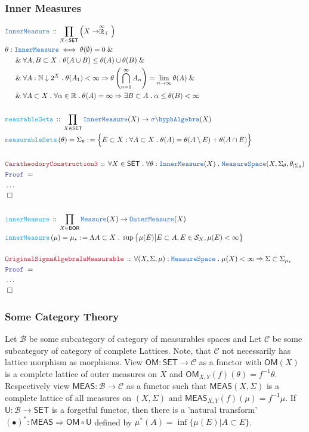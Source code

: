 \documentclass[12pt]{scrartcl}
\newcommand{\TYPE}[1]{\textcolor{NavyBlue}{\mathtt{#1}}}
\newcommand{\FUNC}[1]{\textcolor{Cerulean}{\mathtt{#1}}}
\newcommand{\LOGIC}[1]{\textcolor{Blue}{\mathtt{#1}}}
\newcommand{\THM}[1]{\textcolor{Maroon}{\mathtt{#1}}}
\renewcommand{\.}{\; . \;}
\newcommand{\de}{: \kern 0.1pc =}
\newcommand{\Act}[1]{\left( #1 \right)}
\newcommand{\Theorem}[2]{& \THM{#1} \, :: \, #2 \\ & \Proof = \\ }
\newcommand{\DeclareType}[2]{& \TYPE{#1} \, :: \, #2 \\}
\newcommand{\DefineType}[3]{& #1 : \TYPE{#2} \iff #3 \\}
\newcommand{\DeclareFunc}[2]{& \FUNC{#1} \, :: \, #2 \\}
\newcommand{\DefineNamedFunc}[4]{&  \FUNC{#1}\Act{#2} = #3 \de #4 \\}
\newcommand{\NewLine}{\\ & \kern 1pc}
\newcommand{\Page}[1]{ \begin{align*} #1 \end{align*}   }
\newcommand{\NoProof}{ & \ldots \\ \EndProof}
\renewcommand{\And}{\; \& \;}
\newcommand{\Imply}{\Rightarrow}
\newcommand{\Reals}{\mathbb{R} }
\newcommand{\Nat}{\mathbb{N} }
\newcommand{\EReals}{\stackrel{\mathclap{\infty}}{\mathbb{R}}}
\newcommand{\QED}{\; \square}
\newcommand{\EndProof}{& \QED \\}
\newcommand{\Proof}{\LOGIC{Proof} \; }
\newcommand{\SA}{\TYPE{\sigma \hyph Algebra}}
\newcommand{\SET}{\mathsf{SET}}
\newcommand{\BOR}{\mathsf{BOR}}
\renewcommand{\S}{\mathcal{S}}
\newcommand{\Measure}{\TYPE{Measure}}
\newcommand{\MS}{\TYPE{MeasureSpace}}
\newcommand{\OM}{\TYPE{OuterMeasure}}
\newcommand{\IM}{\TYPE{InnerMeasure}}
\begin{document}
\subsubsection{Inner Measures}
\Page{
	\DeclareType{\IM}{\prod_{X \in \SET} \Big(X \to \EReals_+ \Big)}
	\DefineType{\theta}{\IM}
	{
		\theta(\emptyset) = 0 
		\And \NewLine \And
		\forall A,B \subset X \. \theta(A \cup B) \le \theta(A) \cup \theta(B)
		\And \NewLine \And
		\forall A : \Nat \downarrow 2^X \. \theta(A_1) < \infty \Imply 
		\theta\left( \bigcap^\infty_{n=1} A_n \right) = \lim_{n \to \infty} \theta(A) 
		\And \NewLine \And
		\forall A \subset X \. \forall \alpha \in \Reals \.  \theta(A) = \infty
		\Imply \exists B \subset A \. \alpha \le \theta(B) < \infty
	}
	\\
	\DeclareFunc{meaurableSets}
	{
		\prod_{X \in \SET} \IM(X) \to \SA(X)
	}
	\DefineNamedFunc{measurableSets}{\theta}{\Sigma_\theta}
	{
		\Big\{ E \subset X : \forall A \subset X \. \theta(A) = \theta(A \setminus E) + \theta(A \cap E)   \Big\}
	}
	\\
	\Theorem{CaratheodoryConstruction3}
	{
		\forall X \in \SET \.
		\forall \theta : \IM(X)	\.
		\MS(X,\Sigma_\theta,\theta_{|\Sigma_\theta})
	}
	\NoProof
	\\
	\DeclareFunc{innerMeasure}
	{
		\prod_{X \in \BOR} \Measure(X) \to \OM(X)
	}
	\DefineNamedFunc{innerMeasure}{\mu}{\mu_\star}
	{
		\Lambda A \subset X \.  
		\sup \big\{  \mu(E) \big|   E \subset  A, E \in \S_X, \mu(E) < \infty     \big\}
	}
	\\
	\Theorem{OriginalSigmaAlgebraIsMeasurable}
	{
		\forall (X,\Sigma,\mu) : \MS \.
		\mu(X) < \infty \Imply
		\Sigma \subset \Sigma_{\mu_\star}	
	}
	\NoProof
}
\newpage
\subsubsection{Some Category Theory}
	Let $\mathcal{B}$ be some subcategory of category of measurables spaces and Let $\mathcal{C}$ be some subcategory of category of complete Lattices. Note, that $\mathcal{C}$ not necessarily has lattice morphism as morphisms. View $\mathsf{OM} : \mathsf{SET} \to \mathcal{C}$ as a functor with $\mathsf{OM}(X)$ is a complete lattice of outer measures on $X$ and $\mathsf{OM}_{X,Y}(f)(\theta) = f^{-1}\theta$. Respectively view $\mathsf{MEAS}:\mathcal{B} \to \mathcal{C}$ as a functor such that $\mathsf{MEAS}(X,\Sigma)$ is a complete lattice of all measures on $(X,\Sigma)$ and $\mathsf{MEAS}_{X,Y}(f)(\mu) = f^{-1}\mu$. If $\mathsf{U}:\mathcal{B} \to \mathsf{SET}$ is a forgetful functor, then there is a 'natural transform' $(\bullet)^* : \mathsf{MEAS} \Rightarrow \mathsf{OM \circ U}$ defined by $\mu^*(A) = \inf \{ \mu(E) | A \subset E \}$.
\end{document}
